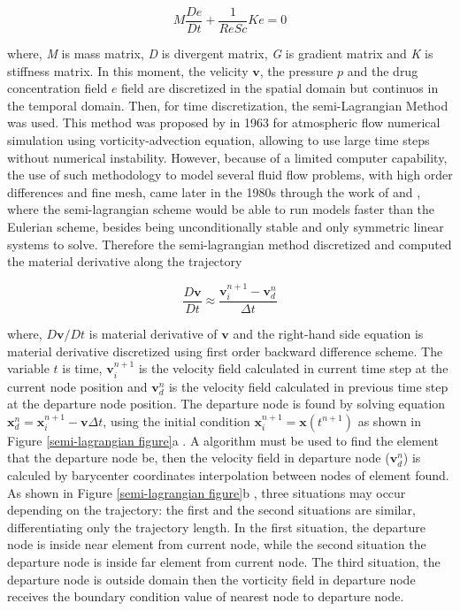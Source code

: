 \documentclass[10pt,fleqn,a4paper,twoside]{article}
\begin{document}
\vspace{-0.65cm}
\begin{equation}
 M \frac{De}{Dt} 
 + \frac{1}{\textit{ReSc}} K e
 = 0 \label{concentration matrix}
\end{equation}



\noindent
where,
\textit{M} is mass matrix,
\textit{D} is divergent matrix,
\textit{G} is gradient matrix and
\textit{K} is stiffness matrix.
In this moment, 
the velicity $\textbf{v}$,
the pressure $p$ and
the drug concentration field $e$ field
are discretized in the spatial domain but
continuos in the temporal domain.
Then, for time discretization, the semi-Lagrangian Method was used. 
This method was proposed by \citeauthor{sawyer1963} in 1963 for atmospheric flow numerical simulation using vorticity-advection equation, allowing to use large time steps without numerical instability. 
However, because of a limited computer capability, the use of such methodology to model several fluid flow problems, with high order differences and fine mesh, came later in the 1980s through the work of \cite{robert1981} and \cite{pironneau1982}, where the semi-lagrangian scheme would be able to run models faster than the Eulerian scheme, besides being unconditionally stable and only symmetric linear systems to solve. 
Therefore the semi-lagrangian method discretized and 
computed the material derivative along the trajectory 


\vspace{-0.4cm}
\begin{equation}
 \frac{D \textbf{v}}{D t} \approx
 \frac{\textbf{v}_{i}^{n+1} - \textbf{v}_{d}^{n}}{\Delta t}
\end{equation}

\noindent
where, 
$D\textbf{v}/Dt$ is material derivative of $\textbf{v}$ and
the right-hand side equation is material derivative discretized using first order backward difference scheme.
The variable $t$ is time, 
$\textbf{v}_{i}^{n+1}$ is the velocity field calculated in current time step at the current node position and
$\textbf{v}_{d}^{n}$ is the velocity field calculated in previous time step at the departure node position.
The departure node is found by solving equation $\mathbf{x}_{d}^{n} = \mathbf{x}_{i}^{n+1} - \mathbf{v} \Delta t$, using the initial condition $\mathbf{x}_{i}^{n+1} = \mathbf{x}(t^{n+1})$ as shown in Figure \ref{semi-lagrangian figure}a . 
A algorithm must be used to find the element that the departure node be, then the velocity field in departure node ($\textbf{v}_{d}^{n}$) is calculed by barycenter coordinates interpolation between nodes of element found.
As shown in Figure \ref{semi-lagrangian figure}b , three situations may occur depending on the trajectory: the first and the second situations are similar, differentiating only the trajectory length. 
In the first situation, the departure node is inside near element from current node, while the second situation the departure node is inside far element from current node. 
The third situation, the departure node is outside domain then the vorticity field in departure node receives the boundary condition value of nearest node to departure node.
\end{document}
